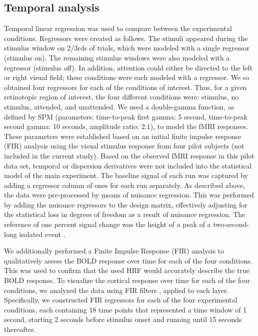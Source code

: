 \documentclass[9pt,lineno]{aperture}
\begin{document}
\subsection{Temporal analysis}
Temporal linear regression was used to compare between the experimental conditions. Regressors were created as follows. The stimuli appeared during the stimulus window on 2/3rds of trials, which were modeled with a single regressor (stimulus on). The remaining stimulus windows were also modeled with a regressor (stimulus off). In addition, attention could either be directed to the left or right visual field; these conditions were each modeled with a regressor. We so obtained four regressors for each of the conditions of interest. Thus, for a given retinotopic region of interest, the four different conditions were: stimulus, no stimulus, attended, and unattended. We used a double-gamma function, as defined by SPM (parameters: time-to-peak first gamma: 5 second, time-to-peak second gamma: 10 seconds, amplitude ratio: 2:1), to model the fMRI responses. These parameters were established based on an initial finite impulse response (FIR) analysis \citep{Friston1998} using the visual stimulus response from four pilot subjects (not included in the current study). Based on the observed fMRI response in this pilot data set, temporal or dispersion derivatives were not included into the statistical model of the main experiment. The baseline signal of each run was captured by adding a regressor column of ones for each run separately. As described above, the data were pre-processed by means of nuisance regression. This was performed by adding the nuisance regressors to the design matrix, effectively adjusting for the statistical loss in degrees of freedom as a result of nuisance regression. The reference of one percent signal change was the height of a peak of a two-second-long isolated event \citep{Mumford2007}.

We additionally performed a Finite Impulse Response (FIR) analysis to qualitatively assess the BOLD response over time for each of the four conditions. This was used to confirm that the used HRF would accurately describe the true BOLD response. To visualize the cortical response over time for each of the four conditions, we analyzed the data using FIR filters \citep{Friston1998}, applied to each layer. Specifically, we constructed FIR regressors for each of the four experimental conditions, each containing 18 time points that represented a time window of 1 second, starting 2 seconds before stimulus onset and running until 15 seconds thereafter. 
\end{document}
